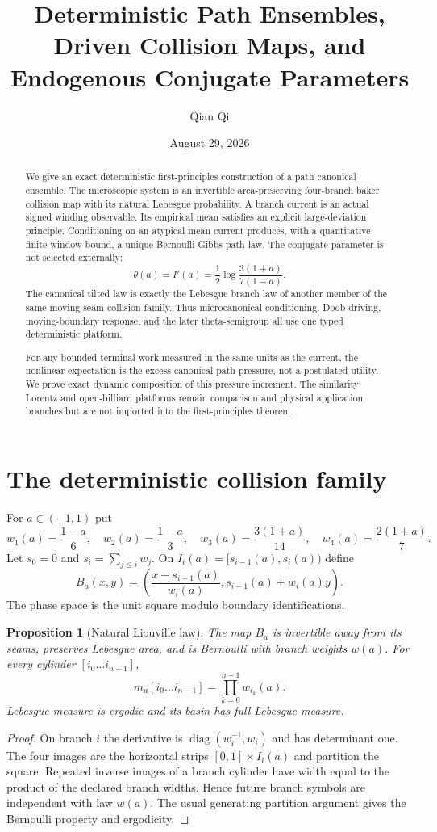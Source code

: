 \documentclass[11pt,reqno]{amsart}
\title[Deterministic path ensembles and driven maps]{Deterministic Path Ensembles, Driven Collision Maps, and Endogenous Conjugate Parameters}
\author{Qian Qi}
\date{August 29, 2026}
\newtheorem{proposition}[theorem]{Proposition}
\theoremstyle{remark}
\begin{document}
\raggedbottom
\begin{abstract}
We give an exact deterministic first-principles construction of a path
canonical ensemble.  The microscopic system is an invertible area-preserving
four-branch baker collision map with its natural Lebesgue probability.  A
branch current is an actual signed winding observable.  Its empirical mean
satisfies an explicit large-deviation principle.  Conditioning on an atypical
mean current produces, with a quantitative finite-window bound, a unique
Bernoulli-Gibbs path law.  The conjugate parameter is not selected externally:
\[
 \theta(a)=I'(a)=\frac12\log\frac{3(1+a)}{7(1-a)}.
\]
The canonical tilted law is exactly the Lebesgue branch law of another member
of the same moving-seam collision family.  Thus microcanonical conditioning,
Doob driving, moving-boundary response, and the later theta-semigroup all use
one typed deterministic platform.

For any bounded terminal work measured in the same units as the current, the
nonlinear expectation is the excess canonical path pressure, not a postulated
utility.  We prove exact dynamic composition of this pressure increment.  The
similarity Lorentz and open-billiard platforms remain comparison and physical
application branches but are not imported into the first-principles theorem.
\end{abstract}
\maketitle
\tableofcontents

\section{The deterministic collision family}
For $a\in(-1,1)$ put
\[
 w_1(a)=\frac{1-a}{6},\quad
 w_2(a)=\frac{1-a}{3},\quad
 w_3(a)=\frac{3(1+a)}{14},\quad
 w_4(a)=\frac{2(1+a)}7.
\]
Let $s_0=0$ and $s_i=\sum_{j\le i}w_j$.  On
$I_i(a)=[s_{i-1}(a),s_i(a))$ define
\[
 B_a(x,y)=\left(
 \frac{x-s_{i-1}(a)}{w_i(a)},
 s_{i-1}(a)+w_i(a)y
 \right).
\]
The phase space is the unit square modulo boundary identifications.

\begin{proposition}[Natural Liouville law]\label{prop:natural}
The map $B_a$ is invertible away from its seams, preserves Lebesgue area, and
is Bernoulli with branch weights $w(a)$.  For every cylinder
$[i_0\ldots i_{n-1}]$,
\[
 m_a[i_0\ldots i_{n-1}]=\prod_{k=0}^{n-1}w_{i_k}(a).
\]
Lebesgue measure is ergodic and its basin has full Lebesgue measure.
\end{proposition}
\begin{proof}
On branch $i$ the derivative is
$\operatorname{diag}(w_i^{-1},w_i)$ and has determinant one.  The four images
are the horizontal strips $[0,1]\times I_i(a)$ and partition the square.
Repeated inverse images of a branch cylinder have width equal to the product
of the declared branch widths.  Hence future branch symbols are independent
with law $w(a)$.  The usual generating partition argument gives the Bernoulli
property and ergodicity.
\end{proof}
\end{document}

